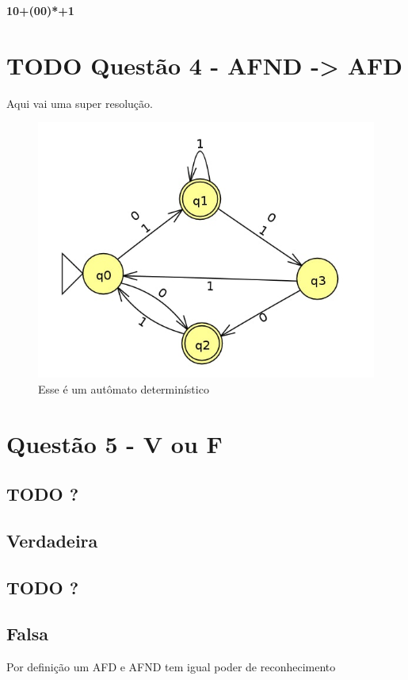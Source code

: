 \documentclass[11pt]{article}
\begin{document}
\textbf{10+(00)*+1} 
\section{{\bfseries\sffamily TODO} Questão 4 - AFND -> AFD}
\label{sec:org6284c62}
Aqui vai uma super resolução.
\begin{figure}[htbp]
\centering
\includegraphics[width=.9\linewidth]{./q4/q4.jpg}
\caption{\label{fig:org3abf3d6}
Esse é um autômato determinístico}
\end{figure}
\section{Questão 5  - V ou F}
\label{sec:org191a2f0}
\subsection{{\bfseries\sffamily TODO} ?}
\label{sec:org432e279}
\subsection{Verdadeira}
\label{sec:orgbe7d41d}
\subsection{{\bfseries\sffamily TODO} ?}
\label{sec:orgd8aa83a}
\subsection{Falsa}
\label{sec:orgdb63a46}
Por definição um AFD e AFND tem igual poder de reconhecimento
\end{document}
